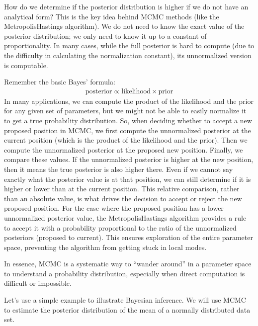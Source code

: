 \documentclass[letterpaper,10pt,english]{jupyterBook}
\begin{document}
\sphinxAtStartPar
How do we determine if the posterior distribution is higher if we do not have an analytical form? This is the key idea behind MCMC methods (like the Metropolis\sphinxhyphen{}Hastings algorithm). We do not need to know the exact value of the posterior distribution; we only need to know it up to a constant of proportionality. In many cases, while the full posterior is hard to compute (due to the difficulty in calculating the normalization constant), its unnormalized version is computable.

\sphinxAtStartPar
Remember the basic Bayes’ formula:
\begin{equation*}
\begin{split}
\text{posterior} \propto \text{likelihood} \times \text{prior}
\end{split}
\end{equation*}
\sphinxAtStartPar
In many applications, we can compute the product of the likelihood and the prior for any given set of parameters, but we might not be able to easily normalize it to get a true probability distribution. So, when deciding whether to accept a new proposed position in MCMC, we first compute the unnormalized posterior at the current position (which is the product of the likelihood and the prior). Then we compute the unnormalized posterior at the proposed new position. Finally, we compare these values. If the unnormalized posterior is higher at the new position, then it means the true posterior is also higher there. Even if we cannot say exactly what the posterior value is at that position, we can still determine if it is higher or lower than at the current position. This relative comparison, rather than an absolute value, is what drives the decision to accept or reject the new proposed position. For the case where the proposed position has a lower unnormalized posterior value, the Metropolis\sphinxhyphen{}Hastings algorithm provides a rule to accept it with a probability proportional to the ratio of the unnormalized posteriors (proposed to current). This ensures exploration of the entire parameter space, preventing the algorithm from getting stuck in local modes.

\sphinxAtStartPar
In essence, MCMC is a systematic way to “wander around” in a parameter space to understand a probability distribution, especially when direct computation is difficult or impossible.

\sphinxAtStartPar
Let’s use a simple example to illustrate Bayesian inference. We will use MCMC to estimate the posterior distribution of the mean of a normally distributed data set.
\end{document}
